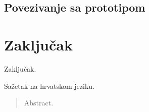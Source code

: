 \documentclass[times, utf8, zavrsni, numeric]{fer}
\begin{document}
\section{Povezivanje sa prototipom}

\chapter{Zaključak}
Zaključak.

\raggedright



\begin{sazetak}
Sažetak na hrvatskom jeziku.

\end{sazetak}

\begin{abstract}
Abstract.

\end{abstract}
\end{document}
